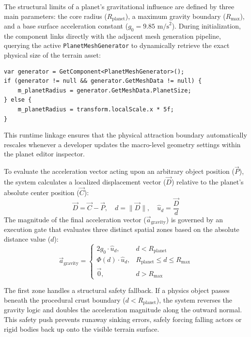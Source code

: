 \documentclass[12pt]{report}
\begin{document}
The structural limits of a planet's gravitational influence are defined by three main parameters: the core radius ($R_{\text{planet}}$), a maximum gravity boundary ($R_{\text{max}}$), and a base surface acceleration constant ($g_0 = 9.85\text{ m/s}^2$). During initialization, the component links directly with the adjacent mesh generation pipeline, querying the active \texttt{PlanetMeshGenerator} to dynamically retrieve the exact physical size of the terrain asset:
\begin{verbatim}
var generator = GetComponent<PlanetMeshGenerator>();
if (generator != null && generator.GetMeshData != null) {
    m_planetRadius = generator.GetMeshData.PlanetSize;
} else {
    m_planetRadius = transform.localScale.x * 5f;
}
\end{verbatim}
This runtime linkage ensures that the physical attraction boundary automatically rescales whenever a developer updates the macro-level geometry settings within the planet editor inspector.

To evaluate the acceleration vector acting upon an arbitrary object position ($\vec{P}$), the system calculates a localized displacement vector ($\vec{D}$) relative to the planet's absolute center position ($\vec{C}$):
\begin{equation}
\vec{D} = \vec{C} - \vec{P}, \quad d = \|\vec{D}\|, \quad \hat{u}_d = \frac{\vec{D}}{d}
\end{equation}
The magnitude of the final acceleration vector ($\vec{a}_{\text{gravity}}$) is governed by an execution gate that evaluates three distinct spatial zones based on the absolute distance value ($d$):
\begin{equation}
\vec{a}_{\text{gravity}} = \begin{cases}
2g_0 \cdot \hat{u}_d, & d < R_{\text{planet}} \\
\Phi(d) \cdot \hat{u}_d, & R_{\text{planet}} \le d \le R_{\text{max}} \\
\vec{0}, & d > R_{\text{max}}
\end{cases}
\end{equation}

The first zone handles a structural safety fallback. If a physics object passes beneath the procedural crust boundary ($d < R_{\text{planet}}$), the system reverses the gravity logic and doubles the acceleration magnitude along the outward normal. This safety push prevents runaway sinking errors, safely forcing falling actors or rigid bodies back up onto the visible terrain surface. 
\end{document}
